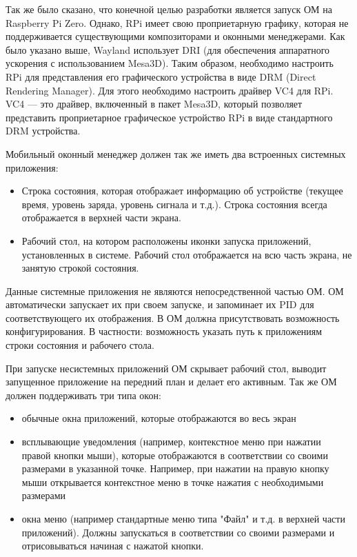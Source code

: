 \documentclass[11pt,a4paper]{extarticle}
\begin{document}
Так же было сказано, что конечной целью разработки является запуск ОМ на Raspberry Pi Zero. Однако, RPi имеет свою проприетарную графику, которая не поддерживается существующими композиторами и оконными менеджерами. Как было указано выше, Wayland использует DRI (для обеспечения аппаратного ускорения с использованием Mesa3D). Таким образом, необходимо настроить RPi для представления его графического устройства в виде DRM (Direct Rendering Manager). Для этого необходимо настроить драйвер VC4 для RPi. VC4 --- это драйвер, включенный в пакет Mesa3D, который позволяет представить проприетарное графическое устройство RPi в виде стандартного DRM устройства.

Мобильный оконный менеджер должен так же иметь два встроенных системных приложения:
\begin{itemize}
\item Строка состояния, которая отображает информацию об устройстве (текущее время, уровень заряда, уровень сигнала и т.д.). Строка состояния всегда отображается в верхней части экрана.
\item Рабочий стол, на котором расположены иконки запуска приложений, установленных в системе. Рабочий стол отображается на всю часть экрана, не занятую строкой состояния.
\end{itemize}
Данные системные приложения не являются непосредственной частью ОМ. ОМ автоматически запускает их при своем запуске, и запоминает их PID для соответствующего их отображения. В ОМ должна присутствовать возможность конфигурирования. В частности: возможность указать путь к приложениям строки состояния и рабочего стола.

При запуске несистемных приложений ОМ скрывает рабочий стол, выводит запущенное приложение на передний план и делает его активным. Так же ОМ должен поддерживать три типа окон:
\begin{itemize}
\item обычные окна приложений, которые отображаются во весь экран
\item всплывающие уведомления (например, контекстное меню при нажатии правой кнопки мыши), которые отображаются в соответствии со своими размерами в указанной точке. Например, при нажатии на правую кнопку мыши открывается контекстное меню в точке нажатия с необходимыми размерами
\item окна меню (например стандартные меню типа "Файл" и т.д. в верхней части приложений). Должны запускаться в соответствии со своими размерами и отрисовываться начиная с нажатой кнопки.
\end{itemize}
\end{document}
